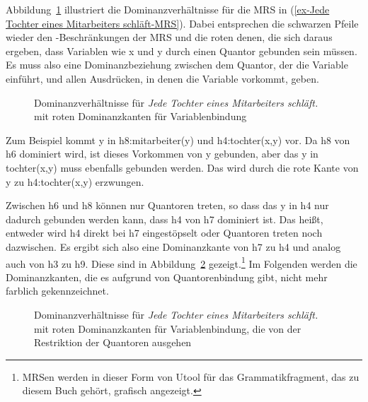 Abbildung~\ref{fig-Jede Tochter eines Mitarbeiters schläft-MRS-Variable}
illustriert die Dominanzverhältnisse für die MRS in (\ref{ex-Jede Tochter eines Mitarbeiters
  schläft-MRS}). Dabei entsprechen die schwarzen Pfeile wieder den \qeq-Beschränkungen der MRS und die
roten denen, die sich daraus ergeben, dass Variablen wie x und y durch einen Quantor gebunden sein
müssen. Es muss also eine Dominanzbeziehung zwischen dem Quantor, der die Variable einführt, und
allen Ausdrücken, in denen die Variable vorkommt, geben.
\begin{figure}
\caption{Dominanzverhältnisse für \emph{Jede Tochter eines Mitarbeiters schläft.} mit roten
  Dominanzkanten für Variablenbindung}\label{fig-Jede Tochter eines Mitarbeiters schläft-MRS-Variable}
\end{figure}
Zum Beispiel kommt y in h8:mitarbeiter(y) und h4:tochter(x,y) vor. Da h8 von h6 dominiert wird, ist
dieses Vorkommen von y gebunden, aber das y in tochter(x,y) muss ebenfalls gebunden werden. Das wird
durch die rote Kante von y zu h4:tochter(x,y) erzwungen.

Zwischen h6 und h8 können nur Quantoren treten, so dass das y in h4 nur dadurch gebunden werden
kann, dass h4 von h7 dominiert ist. Das heißt, entweder wird h4 direkt bei h7 eingestöpselt oder
Quantoren treten noch dazwischen. Es ergibt sich also eine Dominanzkante von h7 zu h4 und analog
auch von h3 zu h9. Diese sind in Abbildung~\ref{fig-Jede Tochter eines Mitarbeiters schläft-MRS}
gezeigt.\footnote{%
  MRSen werden in dieser Form von Utool \citep{KT2005a-u} für das Grammatikfragment, das zu diesem Buch gehört,
  grafisch angezeigt.
} Im Folgenden werden die Dominanzkanten, die es aufgrund von Quantorenbindung gibt, nicht mehr
farblich gekennzeichnet.
\begin{figure}
\caption{Dominanzverhältnisse für \emph{Jede Tochter eines Mitarbeiters schläft.} mit roten
  Dominanzkanten für Variablenbindung, die von der Restriktion der Quantoren ausgehen}\label{fig-Jede Tochter eines Mitarbeiters schläft-MRS}
\end{figure}

